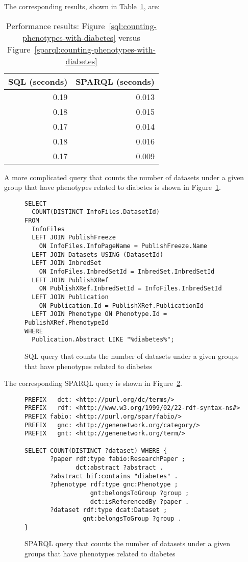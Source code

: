 The corresponding results, shown in Table~\ref{table:perf-2}, are:

\begin{table}[H]
\begin{tabular}{rr}
SQL (seconds) & SPARQL (seconds)\\[0pt]
\toprule
0.19 & 0.013\\[0pt]
0.18 & 0.015\\[0pt]
0.17 & 0.014\\[0pt]
0.18 & 0.016\\[0pt]
0.17 & 0.009\\[0pt]
\end{tabular}
\caption{Performance results: Figure~\ref{sql:counting-phenotypes-with-diabetes} versus Figure~\ref{sparql:counting-phenotypes-with-diabetes} }\label{table:perf-2}
\end{table}

A more complicated query that counts the number of datasets under a given group that have phenotypes related to diabetes is shown in Figure~\ref{sql:datasets-phenotypes-diabetes}.

\begin{figure}[H]
\centering
\begin{verbatim}
SELECT 
  COUNT(DISTINCT InfoFiles.DatasetId) 
FROM 
  InfoFiles 
  LEFT JOIN PublishFreeze
    ON InfoFiles.InfoPageName = PublishFreeze.Name 
  LEFT JOIN Datasets USING (DatasetId) 
  LEFT JOIN InbredSet
    ON InfoFiles.InbredSetId = InbredSet.InbredSetId 
  LEFT JOIN PublishXRef
    ON PublishXRef.InbredSetId = InfoFiles.InbredSetId 
  LEFT JOIN Publication
    ON Publication.Id = PublishXRef.PublicationId 
  LEFT JOIN Phenotype ON Phenotype.Id = PublishXRef.PhenotypeId 
WHERE 
  Publication.Abstract LIKE "%diabetes%";
\end{verbatim}
\caption{SQL query that counts the number of datasets under a given groups that have phenotypes related to diabetes}\label{sql:datasets-phenotypes-diabetes}
\end{figure}

The corresponding SPARQL query is shown in Figure~\ref{sparql:datasets-phenotypes-diabetes}.

\begin{figure}[H]
\centering
\begin{verbatim}
PREFIX   dct: <http://purl.org/dc/terms/>
PREFIX   rdf: <http://www.w3.org/1999/02/22-rdf-syntax-ns#>
PREFIX fabio: <http://purl.org/spar/fabio/>
PREFIX   gnc: <http://genenetwork.org/category/>
PREFIX   gnt: <http://genenetwork.org/term/>

SELECT COUNT(DISTINCT ?dataset) WHERE {
       ?paper rdf:type fabio:ResearchPaper ;
              dct:abstract ?abstract .
       ?abstract bif:contains "diabetes" .
       ?phenotype rdf:type gnc:Phenotype ;
                  gnt:belongsToGroup ?group ;
                  dct:isReferencedBy ?paper .
       ?dataset rdf:type dcat:Dataset ;
                gnt:belongsToGroup ?group .
}
\end{verbatim}
\caption{SPARQL query that counts the number of datasets under a given groups that have phenotypes related to diabetes}\label{sparql:datasets-phenotypes-diabetes}
\end{figure}

